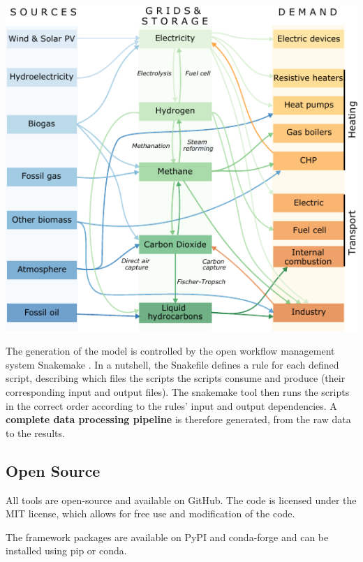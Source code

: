 \documentclass[a0,portrait]{a0poster}
\begin{document}
\begin{multicols}{3}
\begin{center}\vspace{1cm}
  \includegraphics[width=0.7\linewidth]{multisector_figure.pdf}
\end{center}\vspace{1cm}

\noindent
The generation of the model is controlled by the open workflow management system 
Snakemake \cite{Snakemake}. In a nutshell, the Snakefile defines a rule for each defined script, 
describing which files the scripts the scripts consume and produce 
(their corresponding input and output files). The snakemake tool then runs the scripts 
in the correct order according to the rules’ input and output dependencies. A \textbf{complete
data processing pipeline} is therefore generated, from the raw data to the results.

\vspace{2em}

\begin{tcolorbox}[width=0.95\linewidth,colback={conclusion},frame empty,boxsep=1cm]
\section*{Open Source}
  All tools are open-source and available on GitHub. The code is licensed under the MIT
  license, which allows for free use and modification of the code. 
  
  The framework packages are available on PyPI and conda-forge and can be installed using pip or conda.
\end{tcolorbox}    

\columnbreak


\end{multicols}
\end{document}
